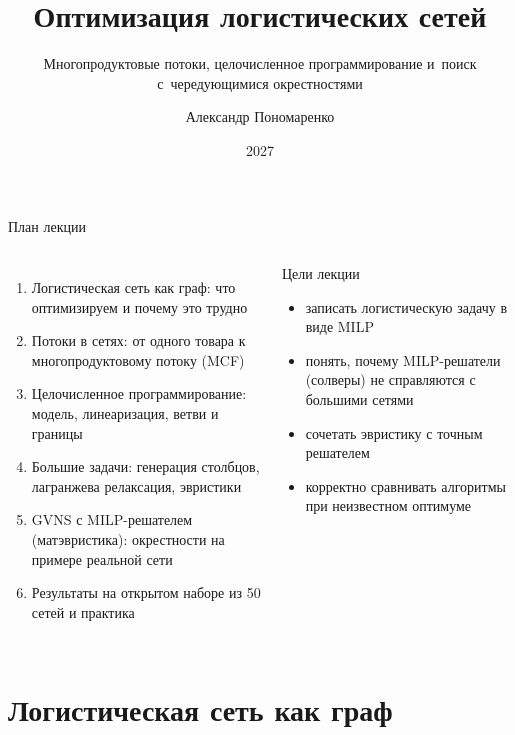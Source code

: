 \documentclass[aspectratio=169,10pt]{beamer}
\title{Оптимизация логистических сетей}
\subtitle{Многопродуктовые потоки, целочисленное программирование и~поиск с~чередующимися окрестностями}
\author{Александр Пономаренко}
\institute{НИУ ВШЭ -- Нижний Новгород, магистратура «Интеллектуальный анализ данных»}
\date{2027}
\begin{document}
\maketitle

\begin{frame}{План лекции}
\begin{columns}[T]
\begin{enumerate}\setlength{\itemsep}{5pt}
\item Логистическая сеть как граф: что оптимизируем и почему это трудно
\item Потоки в сетях: от одного товара к многопродуктовому потоку (MCF)
\item Целочисленное программирование: модель, линеаризация, ветви и границы
\item Большие задачи: генерация столбцов, лагранжева релаксация, эвристики
\item GVNS с MILP-решателем (матэвристика): окрестности на примере реальной сети
\item Результаты на открытом наборе из 50 сетей и практика
\end{enumerate}
\begin{block}{Цели лекции}
\begin{itemize}
\item записать логистическую задачу в виде MILP
\item понять, почему MILP-решатели (солверы) не справляются с большими сетями
\item сочетать эвристику с точным решателем
\item корректно сравнивать алгоритмы при неизвестном оптимуме
\end{itemize}
\end{block}
\end{columns}
\end{frame}

\section{Логистическая сеть как граф}
\end{document}
